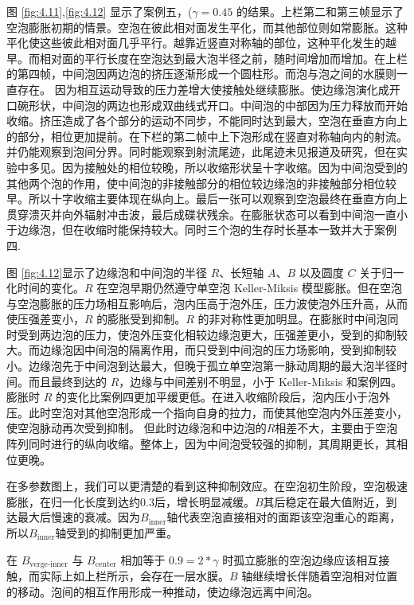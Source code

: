 图 \ref{fig:4.11},\ref{fig:4.12} 显示了案例五，($\gamma=0.45$
的结果。上栏第二和第三帧显示了空泡膨胀初期的情景。空泡在彼此相对面发生平化，而其他部位则如常膨胀。这种平化使这些彼此相对面几乎平行。越靠近竖直对称轴的部位，这种平化发生的越早。而相对面的平行长度在空泡达到最大泡半径之前，随时间增加而增加。在上栏的第四帧，中间泡因两边泡的挤压逐渐形成一个圆柱形。而泡与泡之间的水膜则一直存在。
因为相互运动导致的压力差增大使接触处继续膨胀。使边缘泡演化成开口碗形状，中间泡的两边也形成双曲线式开口。中间泡的中部因为压力释放而开始收缩。挤压造成了各个部分的运动不同步，不能同时达到最大，空泡在垂直方向上的部分，相位更加提前。在下栏的第二帧中上下泡形成在竖直对称轴向内的射流。并仍能观察到泡间分界。同时能观察到射流尾迹，此尾迹未见报道及研究，但在实验中多见。因为接触处的相位较晚，所以收缩形状呈十字收缩。因为中间泡受到的其他两个泡的作用，使中间泡的非接触部分的相位较边缘泡的非接触部分相位较早。所以十字收缩主要体现在纵向上。最后一张可以观察到空泡最终在垂直方向上贯穿溃灭并向外辐射冲击波，最后成碟状残余。在膨胀状态可以看到中间泡一直小于边缘泡，但在收缩时能保持较大。同时三个泡的生存时长基本一致并大于案例四.~

图 \ref{fig:4.12}显示了边缘泡和中间泡的半径 $R$、长短轴 $A$、$B$ 以及圆度
$C$ 关于归一化时间的变化。$R$ 在空泡早期仍然遵守单空泡 Keller-Miksis
模型膨胀。但在空泡与空泡膨胀的压力场相互影响后，泡内压高于泡外压，压力波使泡外压升高，从而使压强差变小，$R$
的膨胀受到抑制。$R$
的非对称性更加明显。在膨胀时中间泡同时受到两边泡的压力，使泡外压变化相较边缘泡更大，压强差更小，受到的抑制较大。而边缘泡因中间泡的隔离作用，而只受到中间泡的压力场影响，受到抑制较小。边缘泡先于中间泡到达最大，但晚于孤立单空泡第一脉动周期的最大泡半径时间。而且最终到达的
$R$，边缘与中间差别不明显，小于 Keller-Miksis 和案例四。膨胀时 $R$
的变化比案例四更加平缓更低。在进入收缩阶段后，泡内压小于泡外压。此时空泡对其他空泡形成一个指向自身的拉力，而使其他空泡内外压差变小，使空泡脉动再次受到抑制。
但此时边缘泡和中边泡的$R$相差不大，主要由于空泡阵列同时进行的纵向收缩。整体上，因为中间泡受较强的抑制，其周期更长，其相位更晚。

在多参数图上，我们可以更清楚的看到这种抑制效应。在空泡初生阶段，空泡极速膨胀，在归一化长度到达约0.3后，增长明显减缓。$B$其后稳定在最大值附近，到达最大后慢速的衰减。因为$B_\mathrm {inner}$轴代表空泡直接相对的面距该空泡重心的距离，所以$B_\mathrm {inner}$轴受到的抑制更加严重。

在 $B_\text{verge-inner}$ 与 $B_\mathrm {center}$ 相加等于
$0.9=2*\gamma$
时孤立膨胀的空泡边缘应该相互接触，而实际上如上栏所示，会存在一层水膜。$B$
轴继续增长伴随着空泡相对位置的移动。泡间的相互作用形成一种推动，使边缘泡远离中间泡。


